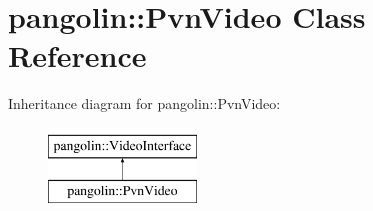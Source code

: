 \hypertarget{classpangolin_1_1_pvn_video}{}\section{pangolin\+:\+:Pvn\+Video Class Reference}
\label{classpangolin_1_1_pvn_video}
Inheritance diagram for pangolin\+:\+:Pvn\+Video\+:\begin{figure}[H]
\begin{center}
\leavevmode
\includegraphics[height=2.000000cm]{classpangolin_1_1_pvn_video}
\end{center}
\end{figure}
